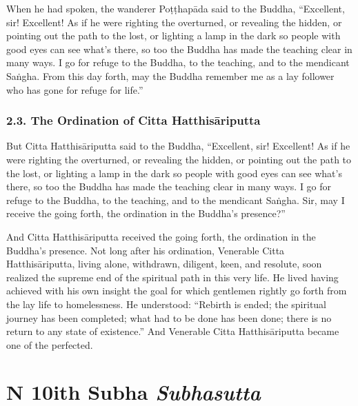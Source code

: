 \documentclass[12pt,openany]{book}%
\newcommand*{\suttatitleacronym}[1]{\smaller[2]{#1}\vspace*{.3em}}
\newcommand*{\suttatitletranslation}[1]{\linebreak{#1}}
\newcommand*{\suttatitleroot}[1]{\linebreak\smaller[2]\itshape{#1}}
\newcommand*{\tocacronym}[1]{\hspace*{-3.3em}{#1}\quad}
\newcommand*{\toctranslation}[1]{#1}
\newcommand*{\tocroot}[1]{(\textit{#1})}
\begin{document}
When he had spoken, the wanderer \textsanskrit{Poṭṭhapāda} said to the Buddha, “Excellent, sir! Excellent! As if he were righting the overturned, or revealing the hidden, or pointing out the path to the lost, or lighting a lamp in the dark so people with good eyes can see what’s there, so too the Buddha has made the teaching clear in many ways. I go for refuge to the Buddha, to the teaching, and to the mendicant \textsanskrit{Saṅgha}. From this day forth, may the Buddha remember me as a lay follower who has gone for refuge for life.” 

\subsection*{2.3. The Ordination of Citta \textsanskrit{Hatthisāriputta} }

But Citta \textsanskrit{Hatthisāriputta} said to the Buddha, “Excellent, sir! Excellent! As if he were righting the overturned, or revealing the hidden, or pointing out the path to the lost, or lighting a lamp in the dark so people with good eyes can see what’s there, so too the Buddha has made the teaching clear in many ways. I go for refuge to the Buddha, to the teaching, and to the mendicant \textsanskrit{Saṅgha}. Sir, may I receive the going forth, the ordination in the Buddha’s presence?” 

And Citta \textsanskrit{Hatthisāriputta} received the going forth, the ordination in the Buddha’s presence. Not long after his ordination, Venerable Citta \textsanskrit{Hatthisāriputta}, living alone, withdrawn, diligent, keen, and resolute, soon realized the supreme end of the spiritual path in this very life. He lived having achieved with his own insight the goal for which gentlemen rightly go forth from the lay life to homelessness. He understood: “Rebirth is ended; the spiritual journey has been completed; what had to be done has been done; there is no return to any state of existence.” And Venerable Citta \textsanskrit{Hatthisāriputta} became one of the perfected. 

%
\chapter*{{\suttatitleacronym DN 10}{\suttatitletranslation With Subha }{\suttatitleroot Subhasutta}}
\addcontentsline{toc}{chapter}{\tocacronym{DN 10} \toctranslation{With Subha } \tocroot{Subhasutta}}
\end{document}
